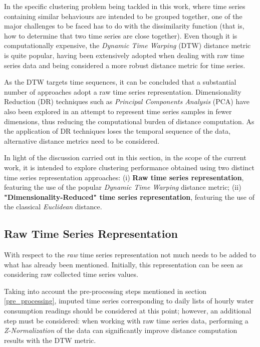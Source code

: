 \documentclass[9pt,journal,compsoc]{IEEEtran}
\begin{document}
In the specific clustering problem being tackled in this work, where time series containing similar behaviours are intended to be grouped together, one of the major challenges to be faced has to do with the dissimilarity function (that is, how to determine that two time series are close together). Even though it is computationally expensive, the \emph{Dynamic Time Warping} (DTW)\cite{chu2002iterative} distance metric is quite popular, having been extensively adopted when dealing with raw time series data\cite{liao2005clustering, petitjean2014dynamic, izakian2015fuzzy, aghabozorgi2015time} and being considered a more robust distance metric for time series\cite{wang2013experimental}. 

As the DTW targets time sequences, it can be concluded that a substantial number of approaches adopt a raw time series representation. Dimensionality Reduction (DR) techniques such as \emph{Principal Components Analysis} (PCA) have also been explored \cite{abreu2012using} in an attempt to represent time series samples in fewer dimensions, thus reducing the computational burden of distance computation. As the application of DR techniques loses the temporal sequence of the data, alternative distance metrics need to be considered.

In light of the discussion carried out in this section, in the scope of the current work, it is intended to explore clustering performance obtained using two distinct time series representation approaches: (i) \textbf{Raw time series representation}, featuring the use of the popular \emph{Dynamic Time Warping} distance metric; (ii) \textbf{"Dimensionality-Reduced" time series representation}, featuring the use of the classical \emph{Euclidean} distance.

\subsection{Raw Time Series Representation}

With respect to the \emph{raw} time series representation not much needs to be added to what has already been mentioned. Initially, this representation can be seen as considering raw collected time series values.

Taking into account the pre-processing steps mentioned in section \ref{pre_processing}, imputed time series corresponding to daily lists of hourly water consumption readings should be considered at this point; however, an additional step must be considered: when working with raw time series data, performing a \emph{Z-Normalization} of the data can significantly improve distance computation results with the DTW metric\cite{mueen2016extracting}.
\end{document}
